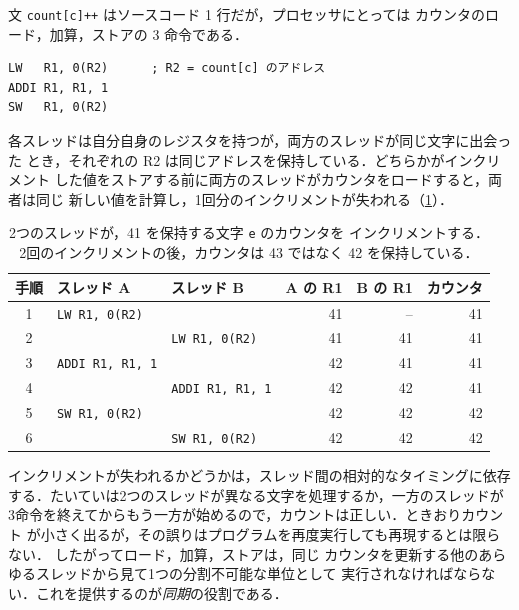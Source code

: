\documentclass[../main.tex]{subfiles}
\begin{document}
文 \texttt{count[c]++} はソースコード 1 行だが，プロセッサにとっては
カウンタのロード，加算，ストアの 3 命令である．
\begin{lstlisting}[language={[x86masm]Assembler}, numbers=none]
LW   R1, 0(R2)      ; R2 = count[c] のアドレス
ADDI R1, R1, 1
SW   R1, 0(R2)
\end{lstlisting}
各スレッドは自分自身のレジスタを持つが，両方のスレッドが同じ文字に出会った
とき，それぞれの R2 は同じアドレスを保持している．どちらかがインクリメント
した値をストアする前に両方のスレッドがカウンタをロードすると，両者は同じ
新しい値を計算し，1回分のインクリメントが失われる（\cref{tab:l20-race}）．

\begin{table}[htbp]
  \centering\small
  \caption{2つのスレッドが，41 を保持する文字 \texttt{e} のカウンタを
    インクリメントする．2回のインクリメントの後，カウンタは 43 ではなく
    42 を保持している．}
  \label{tab:l20-race}
  \begin{tabular}{@{}cllrrr@{}}
    \toprule
    手順 & スレッド A & スレッド B & A の R1 & B の R1 & カウンタ \\
    \midrule
    1 & \texttt{LW R1, 0(R2)}   &                             & 41 & --  & 41 \\
    2 &                         & \texttt{LW R1, 0(R2)}       & 41 & 41  & 41 \\
    3 & \texttt{ADDI R1, R1, 1} &                             & 42 & 41  & 41 \\
    4 &                         & \texttt{ADDI R1, R1, 1}     & 42 & 42  & 41 \\
    5 & \texttt{SW R1, 0(R2)}   &                             & 42 & 42  & 42 \\
    6 &                         & \texttt{SW R1, 0(R2)}       & 42 & 42  & 42 \\
    \bottomrule
  \end{tabular}
\end{table}

インクリメントが失われるかどうかは，スレッド間の相対的なタイミングに依存
する．たいていは2つのスレッドが異なる文字を処理するか，一方のスレッドが
3命令を終えてからもう一方が始めるので，カウントは正しい．ときおりカウント
が小さく出るが，その誤りはプログラムを再度実行しても再現するとは限らない．
したがってロード，加算，ストアは，同じ
カウンタを更新する他のあらゆるスレッドから見て1つの分割不可能な単位として
実行されなければならない．これを提供するのが\emph{同期}の役割である．
\end{document}
